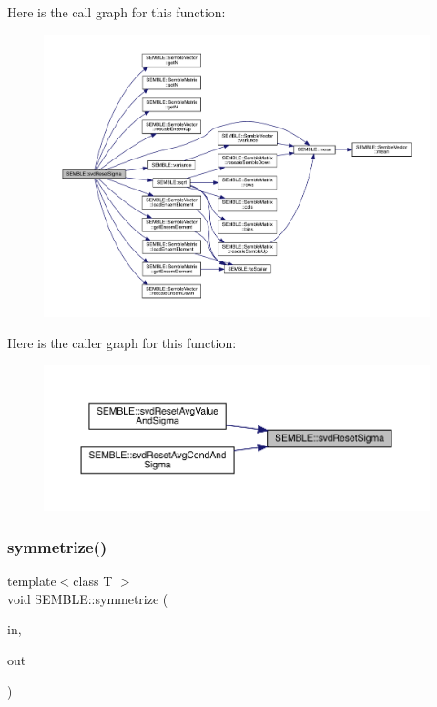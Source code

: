 Here is the call graph for this function\+:
\nopagebreak
\begin{figure}[H]
\begin{center}
\leavevmode
\includegraphics[width=350pt]{d7/dfd/namespaceSEMBLE_a716943d11bf0bdc659ad5ca5834ecf43_cgraph}
\end{center}
\end{figure}
Here is the caller graph for this function\+:
\nopagebreak
\begin{figure}[H]
\begin{center}
\leavevmode
\includegraphics[width=350pt]{d7/dfd/namespaceSEMBLE_a716943d11bf0bdc659ad5ca5834ecf43_icgraph}
\end{center}
\end{figure}
\mbox{\label{namespaceSEMBLE_afc7414654c8245b4e08e751600252d4b}} 
\subsubsection{\texorpdfstring{symmetrize()}{symmetrize()}\hspace{0.1cm}{\footnotesize\ttfamily [1/2]}}
{\footnotesize\ttfamily template$<$class T $>$ \\
void S\+E\+M\+B\+L\+E\+::symmetrize (\begin{DoxyParamCaption}\item[{const \mbox{\hyperlink{structSEMBLE_1_1SembleMatrix}{Semble\+Matrix}}$<$ T $>$ \&}]{in,  }\item[{\mbox{\hyperlink{structSEMBLE_1_1SembleMatrix}{Semble\+Matrix}}$<$ T $>$ \&}]{out }\end{DoxyParamCaption})}

